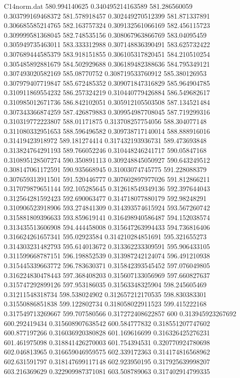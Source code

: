 \begin{filecontents}{C14norm.dat}
580.994140625			0.340495214163589
581.286560059			0.303799169468372
581.578918457			0.302449270512399
581.871337891			0.306685585214765
582.163757324			0.309132561066169
582.456115723			0.309999581368045
582.748535156			0.308067963866769
583.04095459			0.305949735463011
583.333312988			0.307148836390491
583.625732422			0.307689444585379
583.918151855			0.306105317820451
584.210510254			0.305485892881679
584.502929688			0.306189482388636
584.795349121			0.307493020582169
585.08770752			0.308719533760912
585.380126953			0.307979407719847
585.672485352			0.309071847316829
585.964904785			0.310911869554232
586.257324219			0.310440779426884
586.549682617			0.310985012671736
586.842102051			0.305912105503508
587.134521484			0.307343366874259
587.426879883			0.309954987708045
587.719299316			0.310319772223807
588.01171875			0.313708257754056
588.304077148			0.311080332951653
588.596496582			0.309738717140014
588.888916016			0.31419423918972
589.181274414			0.317432193936731
589.473693848			0.313824764291193
589.766052246			0.310448246241717
590.05847168			0.310895128507274
590.350891113			0.309248845050927
590.643249512			0.308147061172591
590.935668945			0.31003074745775
591.228088379			0.307659313911501
591.520446777			0.307602897977026
591.812866211			0.317079879651144
592.105285645			0.312618549349136
592.397644043			0.312564281592423
592.690063477			0.314718077880179
592.98248291			0.310906523918906
593.274841309			0.314393574615924
593.567260742			0.315881809396633
593.859619141			0.316498940586487
594.152038574			0.313435513606908
594.444458008			0.315647263994433
594.736816406			0.316624261657341
595.02923584			0.314210284851691
595.321655273			0.314303231482793
595.614013672			0.313362233309591
595.906433105			0.311599668787151
596.198852539			0.313987242124074
596.491210938			0.315445339663772
596.783630371			0.315842393545452
597.076049805			0.316224830478443
597.368408203			0.315607133056969
597.660827637			0.315747292899126
597.953186035			0.31563348325904
598.245605469			0.31211548318734
598.538024902			0.312657212170535
598.830383301			0.31550886851838
599.122802734			0.318058022911523
599.415222168			0.317549713269667
599.707580566			0.317272408622857
600			0.313945923267692
600.292419434			0.315608907638542
600.584777832			0.318551207747602
600.877197266			0.316036920380828
601.169616699			0.316326425276231
601.461975098			0.318841426270003
601.754394531			0.320770924780698
602.046813965			0.316659046959575
602.339172363			0.314174816568962
602.631591797			0.318147699117148
602.923950195			0.317925639998207
603.216369629			0.322909987371081
603.508789063			0.317402914799335

\end{filecontents}
